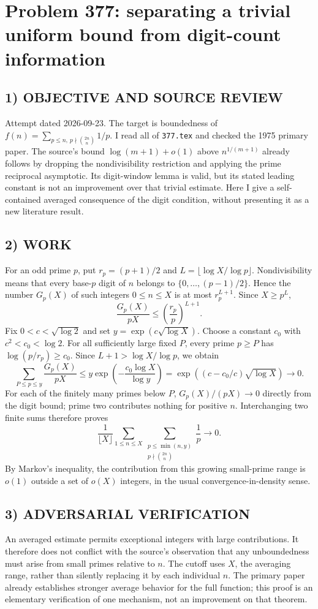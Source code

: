 \section{Problem 377: separating a trivial uniform bound from digit-count information}
\subsection*{1) OBJECTIVE AND SOURCE REVIEW}
Attempt dated 2026-09-23. The target is boundedness of $f(n)=\sum_{p\le n,\ p\nmid\binom{2n}{n}}1/p$. I read all of \texttt{377.tex} and checked the 1975 primary paper. The source's bound $\log(m+1)+o(1)$ above $n^{1/(m+1)}$ already follows by dropping the nondivisibility restriction and applying the prime reciprocal asymptotic. Its digit-window lemma is valid, but its stated leading constant is not an improvement over that trivial estimate. Here I give a self-contained averaged consequence of the digit condition, without presenting it as a new literature result.
\subsection*{2) WORK}
For an odd prime $p$, put $r_p=(p+1)/2$ and $L=\lfloor\log X/\log p\rfloor$. Nondivisibility means that every base-$p$ digit of $n$ belongs to $\{0,\ldots,(p-1)/2\}$. Hence the number $G_p(X)$ of such integers $0\le n\le X$ is at most $r_p^{L+1}$. Since $X\ge p^L$,
\[
\frac{G_p(X)}{pX}\le\left(\frac{r_p}{p}\right)^{L+1}.
\]
Fix $0<c<\sqrt{\log2}$ and set $y=\exp(c\sqrt{\log X})$. Choose a constant $c_0$ with $c^2<c_0<\log2$. For all sufficiently large fixed $P$, every prime $p\ge P$ has $\log(p/r_p)\ge c_0$. Since $L+1>\log X/\log p$, we obtain
\[
\sum_{P\le p\le y}\frac{G_p(X)}{pX}
\le y\exp\left(-\frac{c_0\log X}{\log y}\right)
=\exp\left((c-c_0/c)\sqrt{\log X}\right)\to0.
\]
For each of the finitely many primes below $P$, $G_p(X)/(pX)\to0$ directly from the digit bound; prime two contributes nothing for positive $n$. Interchanging two finite sums therefore proves
\[
\frac1{\lfloor X\rfloor}\sum_{1\le n\le X}
\sum_{\substack{p\le\min(n,y)\\p\nmid\binom{2n}{n}}}\frac1p\longrightarrow0.
\]
By Markov's inequality, the contribution from this growing small-prime range is $o(1)$ outside a set of $o(X)$ integers, in the usual convergence-in-density sense.
\subsection*{3) ADVERSARIAL VERIFICATION}
An averaged estimate permits exceptional integers with large contributions. It therefore does not conflict with the source's observation that any unboundedness must arise from small primes relative to $n$. The cutoff uses $X$, the averaging range, rather than silently replacing it by each individual $n$. The primary paper already establishes stronger average behavior for the full function; this proof is an elementary verification of one mechanism, not an improvement on that theorem.
